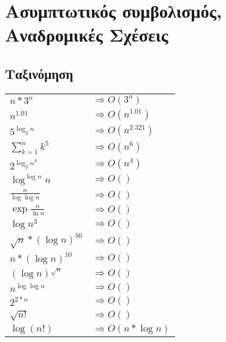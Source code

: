 \documentclass[a4paper,10pt]{article} \usepackage{anysize}
\begin{document}
\def\thesubsection {\alph{subsection}}



\section{Ασυμπτωτικός συμβολισμός, Αναδρομικές
Σχέσεις} \setcounter{section}{1}
\subsection{Ταξινόμηση}
\begin{tabular}{l l}
$ n*3^n$ & $\Rightarrow O(3^n)$ \\
$ n^{1.01}$ & $\Rightarrow O(n^{1.01})$\\
$ 5^{\log _2 {n}}$ & $\Rightarrow O(n^{2.321})$\\
$ \sum_{k=1}^{n}k^5$ & $\Rightarrow O(n^6)$\\
$ 2^{{\log _2 {n}}^4}$ & $\Rightarrow O(n^4)$\\
$ {\log^{\log{n}}{n}}$ & $\Rightarrow O()$\\
$ \frac{n}{\log\log{n}}$ & $\Rightarrow O()$\\
$ \exp{\frac{n}{\ln{n}}}$ & $\Rightarrow O()$\\
$ \log{n^3}$ & $\Rightarrow O()$\\
$ \sqrt{n}*(\log{n})^{50}$ & $\Rightarrow O()$\\
$ n*(\log{n})^{10}$ & $\Rightarrow O()$\\
$ (\log{n})^{\sqrt{n}}$ & $\Rightarrow O()$\\
$ n^{\log{\log{n}}}$ & $\Rightarrow O()$\\
$ 2^{2*n}$ & $\Rightarrow O()$\\
$ \sqrt{n!}$ & $\Rightarrow O()$\\
$ \log{(n!)}$ & $\Rightarrow O(n*\log{n})$\\

\end{tabular}
\end{document}
